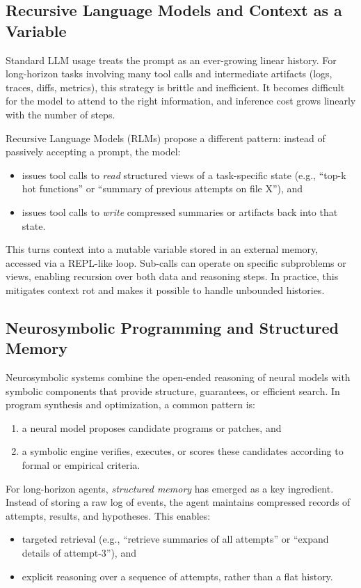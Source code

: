 \documentclass{article}
\theoremstyle{plain}
\theoremstyle{definition}
\theoremstyle{remark}
\begin{document}
\subsection{Recursive Language Models and Context as a Variable}
Standard LLM usage treats the prompt as an ever-growing linear history. For long-horizon tasks involving many tool calls and intermediate artifacts (logs, traces, diffs, metrics), this strategy is brittle and inefficient. It becomes difficult for the model to attend to the right information, and inference cost grows linearly with the number of steps.

Recursive Language Models (RLMs) propose a different pattern: instead of passively accepting a prompt, the model:
\begin{itemize}
    \item issues tool calls to \emph{read} structured views of a task-specific state (e.g., ``top-k hot functions'' or ``summary of previous attempts on file X''), and
    \item issues tool calls to \emph{write} compressed summaries or artifacts back into that state.
\end{itemize}
This turns context into a mutable variable stored in an external memory, accessed via a REPL-like loop. Sub-calls can operate on specific subproblems or views, enabling recursion over both data and reasoning steps. In practice, this mitigates context rot and makes it possible to handle unbounded histories.

\subsection{Neurosymbolic Programming and Structured Memory}
Neurosymbolic systems combine the open-ended reasoning of neural models with symbolic components that provide structure, guarantees, or efficient search. In program synthesis and optimization, a common pattern is:
\begin{enumerate}
    \item a neural model proposes candidate programs or patches, and
    \item a symbolic engine verifies, executes, or scores these candidates according to formal or empirical criteria.
\end{enumerate}

For long-horizon agents, \emph{structured memory} has emerged as a key ingredient. Instead of storing a raw log of events, the agent maintains compressed records of attempts, results, and hypotheses. This enables:
\begin{itemize}
    \item targeted retrieval (e.g., ``retrieve summaries of all attempts'' or ``expand details of attempt-3''), and
    \item explicit reasoning over a sequence of attempts, rather than a flat history.
\end{itemize}
\end{document}
